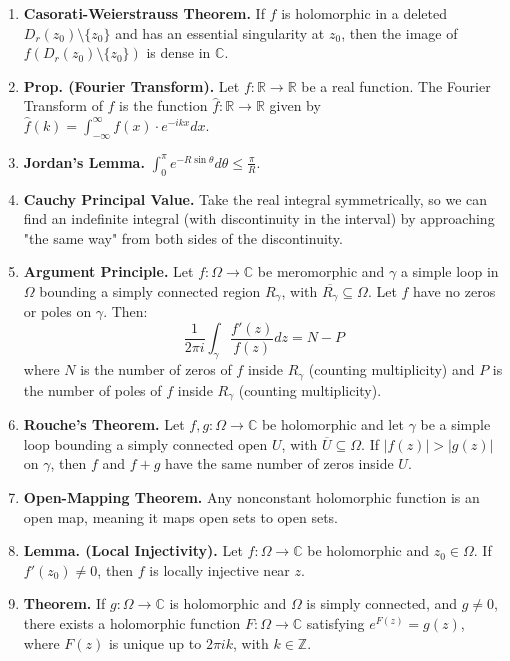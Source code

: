 \documentclass[12pt]{article}
\theoremstyle{definition}
\theoremstyle{named}
\begin{document}
{\begin{multicols}{2}
\begin{spacing}{1.01}
\begin{enumerate}
    $$
    f(z) = \sum_{n=1}^{\infty} \frac{a_{-n}}{(z-z_0)^n} + \sum_{n=0}^{\infty}a_n(z-z_0)^n. 
    $$ where the first infinite series is called the principal part and second one is called the Taylor series / holomorphic part. 
    \item \textbf{Casorati-Weierstrauss Theorem. } If $f$ is holomorphic in a deleted $D_r(z_0) \setminus \{z_0\}$ and has an essential singularity at $z_0$, then the image of $f\left(D_r(z_0) \setminus \{z_0\}\right)$ is dense in $\mathbb{C}$. 
    \item \textbf{Prop. (Fourier Transform). } Let $f: \mathbb{R} \to \mathbb{R}$ be a real function. The Fourier Transform of $f$ is the function $\hat{f}: \mathbb{R} \to \mathbb{R}$ given by $\hat{f}(k) = \int_{-\infty}^{\infty}f(x) \cdot e^{-ikx} dx$. 
    \item \textbf{Jordan's Lemma. } $\int_{0}^{\pi} e^{-R\sin\theta} d\theta \leq \frac{\pi}{R}$. 
    \item \textbf{Cauchy Principal Value. } Take the real integral symmetrically, so we can find an indefinite integral (with discontinuity in the interval) by approaching "the same way" from both sides of the discontinuity. 
    \item \textbf{Argument Principle. } Let $f: \Omega \to \mathbb{C}$ be meromorphic and $\gamma$ a simple loop in $\Omega$ bounding a simply connected region $R_\gamma$, with $\overline{R_\gamma} \subseteq \Omega$. Let $f$ have no zeros or poles on $\gamma$. Then: 
    $$
    \frac{1}{2\pi i} \int_{\gamma} \frac{f'(z)}{f(z)} dz = N - P
    $$ where $N$ is the number of zeros of $f$ inside $R_\gamma$ (counting multiplicity) and $P$ is the number of poles of $f$ inside $R_\gamma$ (counting multiplicity). 
    \item \textbf{Rouche's Theorem. } Let $f,g: \Omega \to \mathbb{C}$ be holomorphic and let $\gamma$ be a simple loop bounding a simply connected open $U$, with $\overline{U} \subseteq \Omega$. If $|f(z)| > |g(z)|$ on $\gamma$, then $f$ and $f+g$ have the same number of zeros inside $U$. 
    \item \textbf{Open-Mapping Theorem. } Any nonconstant holomorphic function is an open map, meaning it maps open sets to open sets. 
    \item \textbf{Lemma. (Local Injectivity). } Let $f: \Omega \to \mathbb{C}$ be holomorphic and $z_0 \in \Omega$. If $f'(z_0) \neq 0$, then $f$ is locally injective near $z$. 
    \item \textbf{Theorem. } If $g: \Omega \to \mathbb{C}$ is holomorphic and $\Omega$ is simply connected, and $g \neq 0$, there exists a holomorphic function $F: \Omega \to \mathbb{C}$ satisfying $e^{F(z)} = g(z)$, where $F(z)$ is unique up to $2\pi ik$, with $k \in \mathbb{Z}$. 

\end{enumerate}
\end{spacing}
\end{multicols}}
\end{document}
